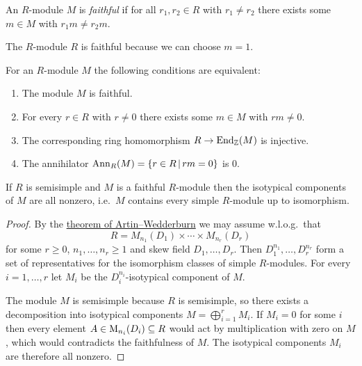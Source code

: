 \begin{definition}
  An $R$-module $M$ is \emph{faithful} if for all $r_1, r_2 \in R$ with $r_1 \neq r_2$ there exists some $m \in M$ with $r_1 m \neq r_2 m$.
\end{definition}


\begin{example}
  The $R$-module $R$ is faithful because we can choose $m = 1$.
\end{example}


\begin{recall}
  For an $R$-module $M$ the following conditions are equivalent:
  \begin{enumerate}
    \item
      The module $M$ is faithful.
    \item
      For every $r \in R$ with $r \neq 0$ there exists some $m \in M$ with $rm \neq 0$.
    \item
      The corresponding ring homomorphism $R \to \operatorname{End}_{\mathbb{Z}}(M)$ is injective.
    \item
      The annihilator $\Ann_R(M) = \{r \in R \suchthat rm = 0\}$ is $0$.
  \end{enumerate}
\end{recall}


\begin{corollary}
  \label{corollary: faithful over ss contains ever simple}
  If $R$ is semisimple and $M$ is a faithful $R$-module then the isotypical components of $M$ are all nonzero, i.e.\ $M$ contains every simple $R$-module up to isomorphism.
\end{corollary}


\begin{proof}
  By the \hyperref[theorem: artin wedderburn theorem]{theorem of Artin--Wedderburn} we may assume w.l.o.g.\ that
  \[
    R = M_{n_1}(D_1) \times \dotsb \times M_{n_r}(D_r)
  \]
  for some $r \geq 0$, $n_1, \dotsc, n_r \geq 1$ and skew field $D_1, \dotsc, D_r$.
  Then $D_1^{n_1}, \dotsc, D_r^{n_r}$ form a set of representatives for the isomorphism classes of simple $R$-modules.
  For every $i = 1, \dotsc, r$ let $M_i$ be the $D_i^{n_i}$-isotypical component of $M$.
  
  The module $M$ is semisimple because $R$ is semisimple, so there exists a decomposition into isotypical components $M = \bigoplus_{i=1}^r M_i$.
  If $M_i = 0$ for some $i$ then every element $A \in \operatorname{M}_{n_i}(D_i) \subseteq R$ would act by multiplication with zero on $M$, which would contradicts the faithfulness of $M$.
  The isotypical components $M_i$ are therefore all nonzero.
\end{proof}


